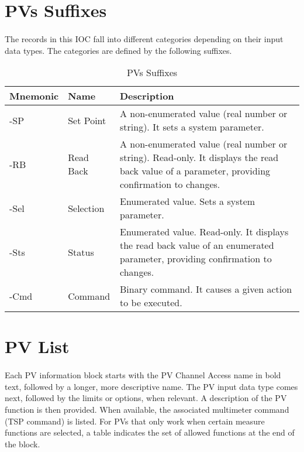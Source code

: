 \documentclass[openany]{article}
\begin{document}
\section{PVs Suffixes}

	\paragraph{} The records in this IOC fall into different categories depending on their input data types. The categories are defined by the following suffixes.

	\begin{table}[!h]
		\center
		\caption{PVs Suffixes}
		\begin{tabular}{m{3cm} m{3cm} m{7cm}}
			\hline
			\bfseries Mnemonic & \bfseries Name & \bfseries Description \\ \hline
			-SP & Set Point & A non-enumerated value (real number or string). It sets a system parameter. \\ \hline
			-RB & Read Back & A non-enumerated value (real number or string). Read-only. It displays the read back value of a parameter, providing confirmation to changes. \\ \hline
			-Sel & Selection & Enumerated value. Sets a system parameter. \\ \hline
			-Sts & Status & Enumerated value. Read-only. It displays the read back value of an enumerated parameter, providing confirmation to changes. \\ \hline
			-Cmd & Command & Binary command. It causes a given action to be executed. \\ \hline
		\end{tabular}
	\end{table}

\section{PV List}

		\paragraph{} Each PV information block starts with the PV Channel Access name in bold text, followed by a longer, more descriptive name. The PV input data type comes next, followed by the limits or options, when relevant. A description of the PV function is then provided. When available, the associated multimeter command (TSP command) is listed. For PVs that only work when certain measure functions are selected, a table indicates the set of allowed functions at the end of the block.
\end{document}
